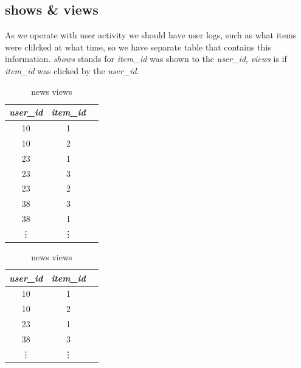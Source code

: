 \documentclass{article}
\begin{document}
\subsection*{shows \& views}

As we operate with user activity we should have user logs, such as what items were clilcked at what time, so we have separate table that contains this information.    \emph{shows} stands for \emph{item\_id} was shown to the \emph{user\_id}, \emph{views} is if \emph{item\_id} was clicked by the \emph{user\_id}.

\begin{table}[h]
    \parbox{.45\textwidth}{
        \centering
        \begin{tabular}{ccc}
            \toprule

            \emph{user\_id} & \emph{item\_id} \\\midrule
            10 & 1  \\
            10 & 2  \\
            23 & 1  \\
            23 & 3  \\
            23 & 2  \\
            38 & 3  \\
            38 & 1  \\
            \vdots & \vdots  \\\bottomrule
        \end{tabular}
        \caption{news shows}
        \label{tab:show}
    }
    \hfill
    \parbox{.45\textwidth}{
        \centering
        \begin{tabular}{ccc}
            \toprule

            \emph{user\_id} & \emph{item\_id} \\\midrule
            10 & 1  \\
            10 & 2  \\
            23 & 1  \\
            38 & 3  \\
            \vdots & \vdots  \\\bottomrule
        \end{tabular}
        \caption{news views}
        \label{tab:view}
        }
\end{table}   


\end{document}
